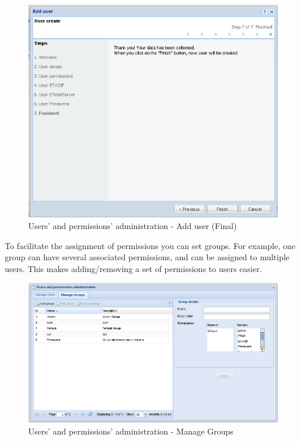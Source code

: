 {\begin{figure}[H]
        \begin{center}
        \includegraphics[scale=0.4]{screenshots/users/etva/create_user_wiz_07.png}
        \caption{Users' and permissions' administration - Add user (Final)}
        \label{fig:create_user_wiz_07}
        \end{center}
\end{figure}

}

To facilitate the assignment of permissions you can set groups. For example, one group can have several associated permissions, and can be assigned to multiple users. This makes adding/removing a set of permissions to users easier.

\begin{figure}[H]
        \begin{center}
        \includegraphics[scale=0.4]{screenshots/users/admin_users_groups.png}
        \caption{Users' and permissions' administration - Manage Groups}
        \label{fig:admin_users_groups}
        \end{center}
\end{figure}


